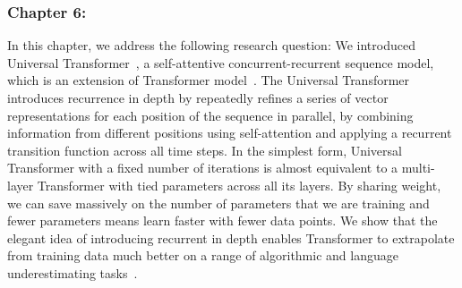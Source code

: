 \subsubsection*{Chapter 6: }
In this chapter, we address the following research question:
We introduced Universal Transformer~\cite{Dehghani:ICLR:2019}, a self-attentive concurrent-recurrent sequence model, which is an extension of Transformer model~\citep{vaswani2017attention}. The Universal Transformer introduces recurrence in depth by repeatedly refines a series of vector representations for each position of the sequence in parallel, by combining information from different positions using self-attention and applying a recurrent transition function across all time steps. 
In the simplest form, Universal Transformer with a fixed number of iterations is almost equivalent to a multi-layer Transformer with tied parameters across all its layers. By sharing weight, we can save massively on the number of parameters that we are training and fewer parameters means learn faster with fewer data points.  We show that the elegant idea of introducing recurrent in depth enables Transformer to extrapolate from training data much better on a range of algorithmic and language underestimating tasks~\citep{Dehghani:ICLR:2019, Dehghani:2019:WSDM}.


